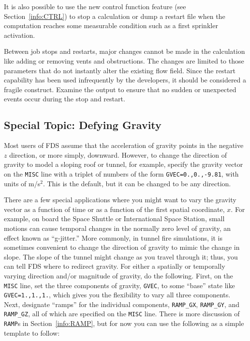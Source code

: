 \documentclass[11pt]{book}
\newcommand{\ct}{\tt\small}
\begin{document}
It is also possible to use the new control function feature (see Section~\ref{info:CTRL})
to stop a calculation or dump a restart file when the computation reaches
some measurable condition such as a first sprinkler activation.

Between job stops and restarts, major changes cannot be made in the calculation
like adding or removing vents and obstructions. The changes are limited to those parameters that do
not instantly alter the existing flow field. Since the restart
capability has been used infrequently by the developers, it should be considered
a fragile construct. Examine the output
to ensure that no sudden or unexpected events occur during the stop and
restart.


\subsection{Special Topic: Defying Gravity}
\label{info:GVEC}

Most users of FDS assume that the acceleration of gravity points in the negative $z$ direction, or more simply, downward.
However, to change the direction of gravity to model
a sloping roof or tunnel, for example, specify the gravity
vector on the {\ct MISC} line with a triplet of numbers of the form
{\ct GVEC=0.,0.,-9.81},
with units of m/s$^2$. This is the default, but it
can be changed to be any direction.

There are a few special applications where you might want to vary the gravity vector as a function of time
or as a function of the first spatial coordinate, $x$. For example, on board the Space Shuttle or International Space Station, small motions can
cause temporal changes in the normally zero level of gravity, an effect known as ``g-jitter.'' More commonly, in tunnel
fire simulations, it is sometimes convenient to change the direction of gravity to mimic the change in slope. The slope
of the tunnel might change as you travel through it; thus, you can tell FDS where to redirect gravity.
For either a spatially or temporally varying direction and/or magnitude of gravity, do the following. First, on the
{\ct MISC} line, set the three components of gravity, {\ct GVEC}, to some ``base'' state like {\ct GVEC=1.,1.,1.},
which gives you the flexibility to vary all three components. Next, designate ``ramps'' for the individual components, {\ct RAMP\_GX},
{\ct RAMP\_GY}, and {\ct RAMP\_GZ}, all of which are specified on the {\ct MISC} line. There is more discussion of
{\ct RAMP}s in Section~\ref{info:RAMP}, but for now you can use the following as a simple template to follow:
\end{document}

